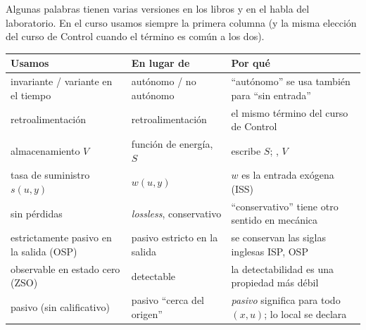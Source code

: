 Algunas palabras tienen varias versiones en los libros y en el habla del laboratorio. En el curso usamos siempre la primera columna (y la misma elección del curso de Control cuando el término es común a los dos).

\begin{center}\small
\begin{tabularx}{\linewidth}{@{}>{\raggedright\arraybackslash}p{3.6cm} >{\raggedright\arraybackslash}p{3.0cm} >{\raggedright\arraybackslash}X@{}}
\toprule
\textbf{Usamos} & \textbf{En lugar de} & \textbf{Por qué}\\
\midrule
invariante / variante en el tiempo & autónomo / no autónomo & ``autónomo'' se usa también para ``sin entrada''\\
retroalimentación & retroalimentación & el mismo término del curso de Control\\
almacenamiento $V$ & función de energía, $S$ & \citet{Wil72a} escribe $S$; \citet{Kha02}, $V$\\
tasa de suministro $s(u,y)$ & $w(u,y)$ & $w$ es la entrada exógena (ISS)\\
sin pérdidas & \emph{lossless}, conservativo & ``conservativo'' tiene otro sentido en mecánica\\
estrictamente pasivo en la salida (OSP) & pasivo estricto en la salida & se conservan las siglas inglesas ISP, OSP\\
observable en estado cero (ZSO) & detectable & la detectabilidad es una propiedad más débil\\
pasivo (sin calificativo) & pasivo ``cerca del origen'' & \emph{pasivo} significa para todo $(x,u)$; lo local se declara\\
\bottomrule
\end{tabularx}
\end{center}
